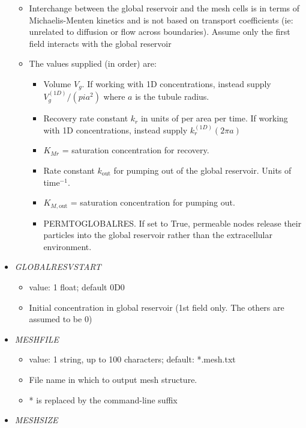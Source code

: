 \documentclass[12pt]{article}
\begin{document}
\begin{itemize}
\begin{itemize}
	\item Interchange between the global reservoir and the mesh cells is in terms of Michaelis-Menten kinetics and is not based on transport coefficients (ie: unrelated to diffusion or flow across boundaries). Assume only the first field interacts with the global reservoir
	\item The values supplied (in order) are:
	\begin{itemize}
		\item Volume $V_g$. If working with 1D concentrations, instead supply $V_g^{(1D)}/(pi a^2)$ where $a$ is the tubule radius.
		\item Recovery rate constant $k_r$ in units of per area per time. If working with 1D concentrations, instead supply $k_r^{(1D)} (2\pi a)$
		\item $K_{Mr}$ = saturation concentration for recovery. 
		\item Rate constant $k_\text{out}$ for pumping out of the global reservoir. Units of time$^{-1}$.
		\item $K_{M,\text{out}}$ = saturation concentration for pumping out.
		\item PERMTOGLOBALRES. If set to True, permeable nodes release their particles into the global reservoir rather than the extracellular environment.
	\end{itemize}
\end{itemize}
%
\item {\it GLOBALRESVSTART}
\begin{itemize}
	\item  value: 1 float; default 0D0
	\item Initial concentration in global reservoir (1st field only. The others are assumed to be 0)
\end{itemize}
%
\item {\it MESHFILE}
\begin{itemize}
	\item  value: 1 string, up to 100 characters; default: *.mesh.txt
	\item File name in which to output mesh structure.
	\item * is replaced by the command-line suffix
\end{itemize}
%
\item {\it MESHSIZE}

\end{itemize}
\end{document}
